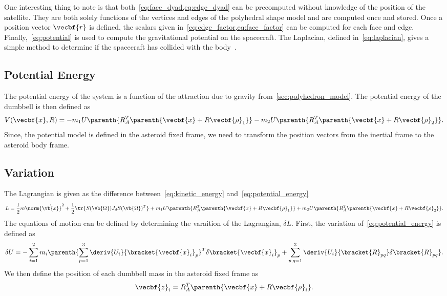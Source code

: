 \documentclass[11pt, reqno]{article}    %
\begin{document}
One interesting thing to note is that both~\cref{eq:face_dyad,eq:edge_dyad} can be precomputed without knowledge of the position of the satellite.
They are both solely functions of the vertices and edges of the polyhedral shape model and are computed once and stored.
Once a position vector \( \vecbf{r} \) is defined, the scalars given in~\cref{eq:edge_factor,eq:face_factor} can be computed for each face and edge.
Finally,~\cref{eq:potential} is used to compute the gravitational potential on the spacecraft.
The Laplacian, defined in~\cref{eq:laplacian}, gives a simple method to determine if the spacecraft has collided with the body~\cite{werner1996}. 

\subsection{Potential Energy}
The potential energy of the system is a function of the attraction due to gravity from~\cref{sec:polyhedron_model}.
The potential energy of the dumbbell is then defined as
\begin{align}\label{eq:potential_energy}
    V( \vecbf{x}, R ) =  - m_1 U \parenth{R_A^T \parenth{\vecbf{x} + R \vecbf{\rho}_1}} - m_2 U \parenth{R_A^T \parenth{\vecbf{x} + R \vecbf{\rho}_2}} .
\end{align}
Since, the potential model is defined in the asteroid fixed frame, we need to transform the position vectors from the inertial frame to the asteroid body frame.

\subsection{Variation}
The Lagrangian is given as the difference between~\cref{eq:kinetic_energy} and~\cref{eq:potential_energy}
\begin{align}\label{eq:lagrangian}
    L = \frac{1}{2} m \norm{\dot{\vb{x}}}^2 + \frac{1}{2} \tr{S(\vb{\Omega}) J_d S(\vb{\Omega})^T} + m_1 U \parenth{R_A^T \parenth{\vecbf{x} + R \vecbf{\rho}_1}} + m_2 U \parenth{R_A^T \parenth{\vecbf{x} + R \vecbf{\rho}_2}} .
\end{align}
The equations of motion can be defined by determining the varaition of the Lagrangian, \( \delta L\).
First, the variation of~\cref{eq:potential_energy} is defined as
\begin{align*}
    \delta U = - \sum_{i=1}^2 m_i \parenth{\sum_{p=1}^3 \deriv{U_i}{\bracket{\vecbf{x}_i}_p}^T \delta \bracket{\vecbf{x}_i}_p + \sum_{p,q=1}^3 \deriv{U_i}{\bracket{R}_{pq} } \delta \bracket{R}_{pq} }.
\end{align*}
We then define the position of each dumbbell mass in the asteroid fixed frame as
\begin{align}\label{eq:pos_asteroid_frame}
    \vecbf{z}_i = R_A^T \parenth{\vecbf{x} + R \vecbf{\rho}_i}.
\end{align}
\end{document}
